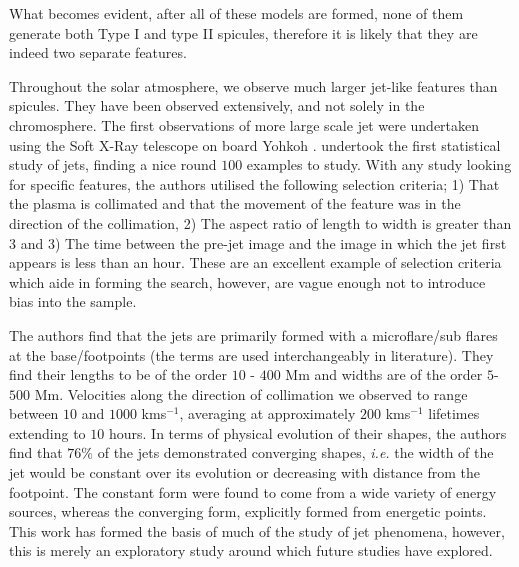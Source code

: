 What becomes evident, after all of these models are formed, none of them generate both Type I and type II spicules, therefore it is likely that they are indeed two separate features.


Throughout the solar atmosphere, we observe much larger jet-like features than spicules.
They have been observed extensively, and not solely in the chromosphere.
The first observations of more large scale jet were undertaken using the Soft X-Ray telescope on board Yohkoh \citep{Tsuneta1991}.
\cite{Shimojo1996} undertook the first statistical study of jets, finding a nice round $100$ examples to study.
With any study looking for specific features, the authors utilised the following selection criteria; 1) That the plasma is collimated and that the movement of the feature was in the direction of the collimation, 2) The aspect ratio of length to width is greater than $3$ and 3) The time between the pre-jet image and the image in which the jet first appears is less than an hour.
These are an excellent example of selection criteria which aide in forming the search, however, are vague enough not to introduce bias into the sample.

The authors find that the jets are primarily formed with a microflare/sub flares at the base/footpoints (the terms are used interchangeably in literature).
They find their lengths to be of the order $10$ - $400$ Mm and widths are of the order $5$-$500$ Mm.
Velocities along the direction of collimation we observed to range between $10$ and $1000$ kms$^{-1}$, averaging at approximately $200$ kms$^{-1}$ lifetimes extending to $10$ hours.
In terms of physical evolution of their shapes, the authors find that $76\%$ of the jets demonstrated converging shapes, \emph{i.e.} the width of the jet would be constant over its evolution or decreasing with distance from the footpoint. The constant form were found to come from a wide variety of energy sources, whereas the converging form, explicitly formed from energetic points. 
This work has formed the basis of much of the study of jet phenomena, however, this is merely an exploratory study around which future studies have explored.


